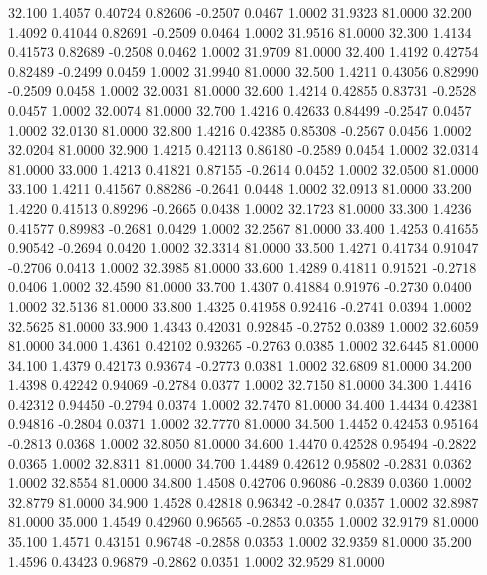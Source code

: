   32.100   1.4057   0.40724   0.82606  -0.2507   0.0467   1.0002  31.9323  81.0000
  32.200   1.4092   0.41044   0.82691  -0.2509   0.0464   1.0002  31.9516  81.0000
  32.300   1.4134   0.41573   0.82689  -0.2508   0.0462   1.0002  31.9709  81.0000
  32.400   1.4192   0.42754   0.82489  -0.2499   0.0459   1.0002  31.9940  81.0000
  32.500   1.4211   0.43056   0.82990  -0.2509   0.0458   1.0002  32.0031  81.0000
  32.600   1.4214   0.42855   0.83731  -0.2528   0.0457   1.0002  32.0074  81.0000
  32.700   1.4216   0.42633   0.84499  -0.2547   0.0457   1.0002  32.0130  81.0000
  32.800   1.4216   0.42385   0.85308  -0.2567   0.0456   1.0002  32.0204  81.0000
  32.900   1.4215   0.42113   0.86180  -0.2589   0.0454   1.0002  32.0314  81.0000
  33.000   1.4213   0.41821   0.87155  -0.2614   0.0452   1.0002  32.0500  81.0000
  33.100   1.4211   0.41567   0.88286  -0.2641   0.0448   1.0002  32.0913  81.0000
  33.200   1.4220   0.41513   0.89296  -0.2665   0.0438   1.0002  32.1723  81.0000
  33.300   1.4236   0.41577   0.89983  -0.2681   0.0429   1.0002  32.2567  81.0000
  33.400   1.4253   0.41655   0.90542  -0.2694   0.0420   1.0002  32.3314  81.0000
  33.500   1.4271   0.41734   0.91047  -0.2706   0.0413   1.0002  32.3985  81.0000
  33.600   1.4289   0.41811   0.91521  -0.2718   0.0406   1.0002  32.4590  81.0000
  33.700   1.4307   0.41884   0.91976  -0.2730   0.0400   1.0002  32.5136  81.0000
  33.800   1.4325   0.41958   0.92416  -0.2741   0.0394   1.0002  32.5625  81.0000
  33.900   1.4343   0.42031   0.92845  -0.2752   0.0389   1.0002  32.6059  81.0000
  34.000   1.4361   0.42102   0.93265  -0.2763   0.0385   1.0002  32.6445  81.0000
  34.100   1.4379   0.42173   0.93674  -0.2773   0.0381   1.0002  32.6809  81.0000
  34.200   1.4398   0.42242   0.94069  -0.2784   0.0377   1.0002  32.7150  81.0000
  34.300   1.4416   0.42312   0.94450  -0.2794   0.0374   1.0002  32.7470  81.0000
  34.400   1.4434   0.42381   0.94816  -0.2804   0.0371   1.0002  32.7770  81.0000
  34.500   1.4452   0.42453   0.95164  -0.2813   0.0368   1.0002  32.8050  81.0000
  34.600   1.4470   0.42528   0.95494  -0.2822   0.0365   1.0002  32.8311  81.0000
  34.700   1.4489   0.42612   0.95802  -0.2831   0.0362   1.0002  32.8554  81.0000
  34.800   1.4508   0.42706   0.96086  -0.2839   0.0360   1.0002  32.8779  81.0000
  34.900   1.4528   0.42818   0.96342  -0.2847   0.0357   1.0002  32.8987  81.0000
  35.000   1.4549   0.42960   0.96565  -0.2853   0.0355   1.0002  32.9179  81.0000
  35.100   1.4571   0.43151   0.96748  -0.2858   0.0353   1.0002  32.9359  81.0000
  35.200   1.4596   0.43423   0.96879  -0.2862   0.0351   1.0002  32.9529  81.0000
